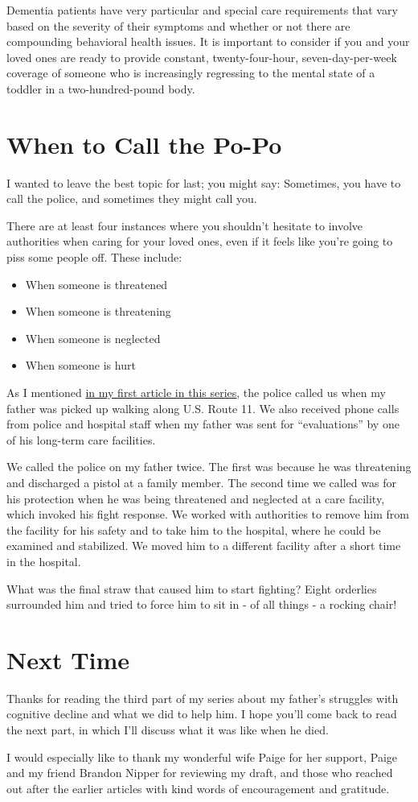 \documentclass{article}
\begin{document}
Dementia patients have very particular and special care requirements that vary based on the severity of their symptoms and whether or not there are compounding behavioral health issues. It is important to consider if you and your loved ones are ready to provide constant, twenty-four-hour, seven-day-per-week coverage of someone who is increasingly regressing to the mental state of a toddler in a two-hundred-pound body.

\section*{When to Call the Po-Po}

I wanted to leave the best topic for last; you might say: Sometimes, you have to call the police, and sometimes they might call you.

There are at least four instances where you shouldn't hesitate to involve authorities when caring for your loved ones, even if it feels like you're going to piss some people off. These include:
\begin{itemize}
    \item When someone is threatened
    \item When someone is threatening
    \item When someone is neglected
    \item When someone is hurt
\end{itemize}

As I mentioned \href{https://jayjaybillings.com/2023/07/06/outliving-your-mind-part-1-the-secret/}{in my first article in this series}, the police called us when my father was picked up walking along U.S. Route 11. We also received phone calls from police and hospital staff when my father was sent for ``evaluations'' by one of his long-term care facilities.

We called the police on my father twice. The first was because he was threatening and discharged a pistol at a family member. The second time we called was for his protection when he was being threatened and neglected at a care facility, which invoked his fight response. We worked with authorities to remove him from the facility for his safety and to take him to the hospital, where he could be examined and stabilized. We moved him to a different facility after a short time in the hospital.

What was the final straw that caused him to start fighting? Eight orderlies surrounded him and tried to force him to sit in - of all things - a rocking chair!

\section*{Next Time}

Thanks for reading the third part of my series about my father’s struggles with cognitive decline and what we did to help him. I hope you’ll come back to read the next part, in which I'll discuss what it was like when he died.

I would especially like to thank my wonderful wife Paige for her support, Paige and my friend Brandon Nipper for reviewing my draft, and those who reached out after the earlier articles with kind words of encouragement and gratitude. 
\end{document}
